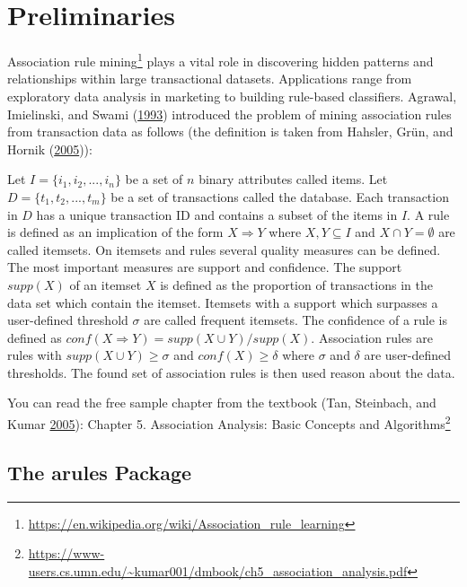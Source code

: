 \documentclass[
  notitlepage]{book}
\DeclareRobustCommand{\href}[2]{#2\footnote{\url{#1}}}
\begin{document}
\hypertarget{preliminaries}{%
\section{Preliminaries}\label{preliminaries}}

\href{https://en.wikipedia.org/wiki/Association_rule_learning}{Association rule mining}
plays a vital role in discovering hidden patterns and relationships within large
transactional datasets. Applications range from exploratory data analysis in marketing to building rule-based
classifiers.
Agrawal, Imielinski, and Swami (\protect\hyperlink{ref-arules:Agrawal+Imielinski+Swami:1993}{1993}) introduced the problem
of mining association rules from transaction data as follows (the definition is taken from Hahsler, Grün, and Hornik (\protect\hyperlink{ref-arules:Hahsler+Gruen+Hornik:2005b}{2005})):

Let \(I = \{i_1,i_2,...,i_n\}\) be a set of \(n\) binary attributes called items. Let \(D = \{t_1,t_2,...,t_m\}\) be
a set of transactions called the database. Each transaction in \(D\) has a unique transaction ID and
contains a subset of the items in \(I\). A rule is defined as an implication of the form \(X \Rightarrow Y\) where
\(X,Y \subseteq I\) and \(X \cap Y = \emptyset\) are called itemsets. On itemsets and rules several quality measures can
be defined. The most important measures are support and confidence. The support \(supp(X)\) of
an itemset \(X\) is defined as the proportion of transactions in the data set which contain the itemset.
Itemsets with a support which surpasses a user-defined threshold \(\sigma\) are called frequent itemsets. The
confidence of a rule is defined as \(conf(X \Rightarrow Y) = supp(X \cup Y)/supp(X)\). Association rules are rules
with \(supp(X \cup Y) \ge \sigma\) and \(conf(X) \ge \delta\) where \(\sigma\) and \(\delta\) are user-defined thresholds.
The found set of association rules is then used reason about the data.

You can read the free sample chapter from the textbook (Tan, Steinbach, and Kumar \protect\hyperlink{ref-Tan2005}{2005}):
\href{https://www-users.cs.umn.edu/~kumar001/dmbook/ch5_association_analysis.pdf}{Chapter 5. Association Analysis: Basic Concepts and
Algorithms}

\hypertarget{the-arules-package}{%
\subsection{The arules Package}\label{the-arules-package}}
\end{document}
